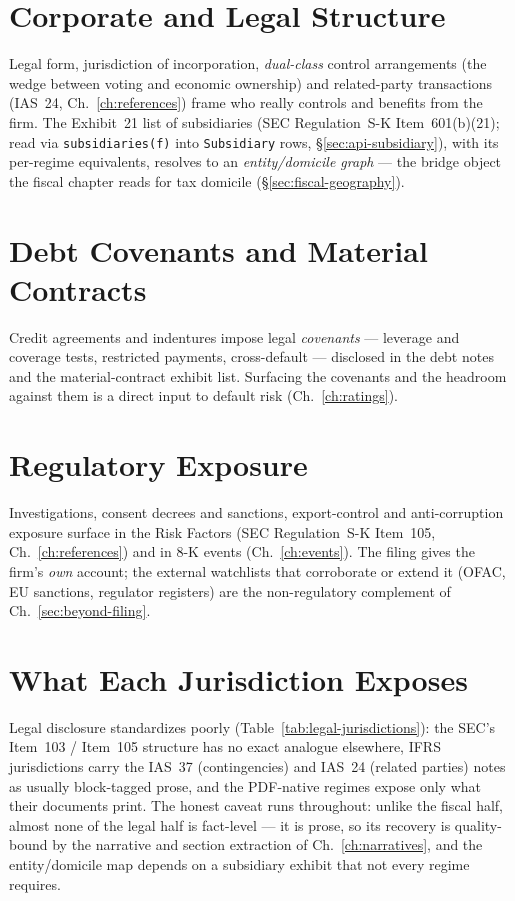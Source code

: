\documentclass[11pt,a4paper]{report}
\begin{document}
\section{Corporate and Legal Structure}
\label{sec:legal-structure}
Legal form, jurisdiction of incorporation, \emph{dual-class} control arrangements (the wedge between voting and
economic ownership) and related-party transactions (IAS~24, Ch.~\ref{ch:references}) frame who really controls
and benefits from the firm. The Exhibit~21 list of subsidiaries (SEC Regulation~S-K Item~601(b)(21); read via
\texttt{subsidiaries(f)} into \texttt{Subsidiary} rows, \S\ref{sec:api-subsidiary}), with its per-regime
equivalents, resolves to an \emph{entity/domicile graph} --- the bridge object the fiscal chapter
reads for tax domicile (\S\ref{sec:fiscal-geography}).

\section{Debt Covenants and Material Contracts}
Credit agreements and indentures impose legal \emph{covenants} --- leverage and coverage tests, restricted
payments, cross-default --- disclosed in the debt notes and the material-contract exhibit list. Surfacing the
covenants and the headroom against them is a direct input to default risk (Ch.~\ref{ch:ratings}).

\section{Regulatory Exposure}
Investigations, consent decrees and sanctions, export-control and anti-corruption exposure surface in the Risk
Factors (SEC Regulation~S-K Item~105, Ch.~\ref{ch:references}) and in 8-K events (Ch.~\ref{ch:events}). The
filing gives the firm's \emph{own} account; the external watchlists that corroborate or extend it (OFAC, EU
sanctions, regulator registers) are the non-regulatory complement of Ch.~\ref{sec:beyond-filing}.

\section{What Each Jurisdiction Exposes}
Legal disclosure standardizes poorly (Table~\ref{tab:legal-jurisdictions}): the SEC's Item~103 / Item~105
structure has no exact analogue elsewhere, IFRS jurisdictions carry the IAS~37 (contingencies) and IAS~24
(related parties) notes as usually block-tagged prose, and the PDF-native regimes expose only what their
documents print. The honest caveat runs throughout: unlike the fiscal half, almost none of the legal half is
fact-level --- it is prose, so its recovery is quality-bound by the narrative and section extraction of
Ch.~\ref{ch:narratives}, and the entity/domicile map depends on a subsidiary exhibit that not every regime
requires.
\end{document}
